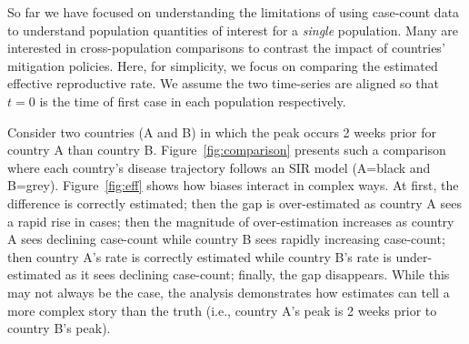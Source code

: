 \documentclass[11pt]{amsart}
\numberwithin{equation}{section}
\theoremstyle{plain}
\begin{document}
 So far we have focused on understanding the limitations of using case-count data to understand population quantities of interest for a \emph{single} population.  Many are interested in cross-population comparisons to contrast the impact of countries' mitigation policies.  Here, for simplicity, we focus on comparing the estimated effective reproductive rate.  We assume the two time-series are aligned so that $t=0$ is the time of first case in each population respectively.

 Consider two countries (A and B) in which the peak occurs 2 weeks prior for country A than country B.  Figure~\ref{fig:comparison} presents such a comparison where each country's disease trajectory follows an SIR model (A=black and B=grey). Figure~\ref{fig:eff} shows how biases interact in complex ways.  At first, the difference is correctly estimated; then the gap is over-estimated as country A sees a rapid rise in cases; then the magnitude of over-estimation increases as country A sees declining case-count while country B sees rapidly increasing case-count; then country A's rate is correctly estimated while country B's rate is under-estimated as it sees declining case-count; finally, the gap disappears.  While this may not always be the case, the analysis demonstrates how estimates can tell a more complex story than the truth (i.e., country A's peak is 2 weeks prior to country B's peak).
\end{document}
